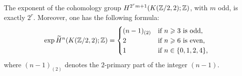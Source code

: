 The exponent of the cohomology group $H^{2^r m+1}(K(\mathbb{Z}/2,2);\mathbb{Z})$, with $m$ odd, is exactly $2^r$. Moreover, one has the following formula:
\begin{align*}
\exp\widetilde{H}^n(K(\mathbb{Z}/2,2);\mathbb{Z})&=\begin{cases}
(n-1)_{(2)} &\text{if $n\geqslant3$ is odd,}\\
2 &\text{if $n\geqslant6$ is even,}\\
1 &\text{if $n\in\{0,1,2,4\}$,}
\end{cases}\\
\end{align*}
where $(n-1)_{(2)}$ denotes the $2$-primary part of the integer $(n-1)$.
\endinput